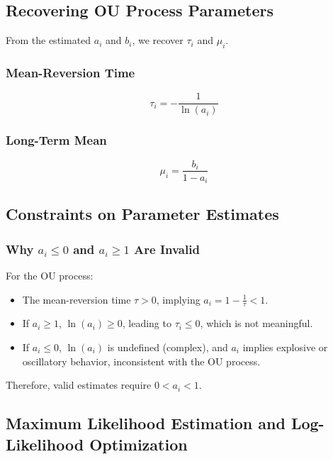 \documentclass[12pt,article]{memoir}
\begin{document}
{\subsection{Recovering OU Process Parameters}

From the estimated $a_i$ and $b_i$, we recover $\tau_i$ and $\mu_i$.

\subsubsection{Mean-Reversion Time}

\begin{equation}
\tau_i = -\frac{1}{\ln(a_i)}
\end{equation}

\subsubsection{Long-Term Mean}

\begin{equation}
\mu_i = \frac{b_i}{1 - a_i}
\end{equation}

\subsection{Constraints on Parameter Estimates}

\subsubsection{Why $a_i \leq 0$ and $a_i \geq 1$ Are Invalid}

For the OU process:

\begin{itemize}
    \item The mean-reversion time $\tau > 0$, implying $a_i = 1 - \frac{1}{\tau} < 1$.
    \item If $a_i \geq 1$, $\ln(a_i) \geq 0$, leading to $\tau_i \leq 0$, which is not meaningful.
    \item If $a_i \leq 0$, $\ln(a_i)$ is undefined (complex), and $a_i$ implies explosive or oscillatory behavior, inconsistent with the OU process.
\end{itemize}

Therefore, valid estimates require $0 < a_i < 1$.

\subsection{Maximum Likelihood Estimation and Log-Likelihood Optimization}

}
\end{document}
